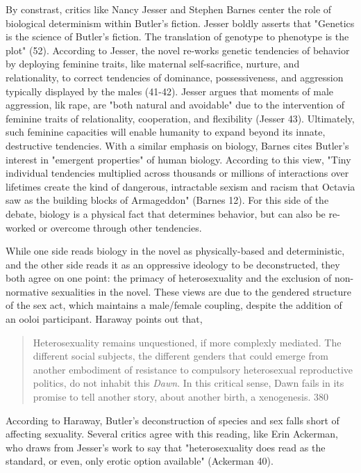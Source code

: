 \documentclass[11pt]{article}
\begin{document}
\begin{enumerate}
By constrast, critics like Nancy Jesser and Stephen Barnes center the
role of biological determinism within Butler's fiction. Jesser boldly
asserts that "Genetics is the science of Butler's fiction. The
translation of genotype to phenotype is the plot" (52). According to
Jesser, the novel re-works genetic tendencies of behavior by deploying
feminine traits, like maternal self-sacrifice, nurture, and
relationality, to correct tendencies of dominance, possessiveness, and
aggression typically displayed by the males (41-42). Jesser argues
that moments of male aggression, lik rape, are "both natural and
avoidable" due to the intervention of feminine traits of
relationality, cooperation, and flexibility (Jesser 43). Ultimately,
such feminine capacities will enable humanity to expand beyond its
innate, destructive tendencies. With a similar emphasis on biology,
Barnes cites Butler's interest in "emergent properties" of human
biology. According to this view, "Tiny individual tendencies
multiplied across thousands or millions of interactions over lifetimes
create the kind of dangerous, intractable sexism and racism that
Octavia saw as the building blocks of Armageddon" (Barnes 12). For
this side of the debate, biology is a physical fact that determines
behavior, but can also be re-worked or overcome through other
tendencies.

While one side reads biology in the novel as physically-based and
deterministic, and the other side reads it as an oppressive ideology
to be deconstructed, they both agree on one point: the primacy of
heterosexuality and the exclusion of non-normative sexualities in the
novel. These views are due to the gendered structure of the sex act,
which maintains a male/female coupling, despite the addition of an
ooloi participant. Haraway points out that,
\begin{quote}
Heterosexuality remains unquestioned, if more complexly mediated. The
different social subjects, the different genders that could emerge
from another embodiment of resistance to compulsory heterosexual
reproductive politics, do not inhabit this \emph{Dawn}. In this critical
sense, Dawn fails in its promise to tell another story, about another
birth, a xenogenesis. 380
\end{quote}
According to Haraway, Butler's deconstruction of species and sex falls
short of affecting sexuality. Several critics agree with this reading,
like Erin Ackerman, who draws from Jesser's work to say that
"heterosexuality does read as the standard, or even, only erotic
option available" (Ackerman 40).


\end{enumerate}
\end{document}
